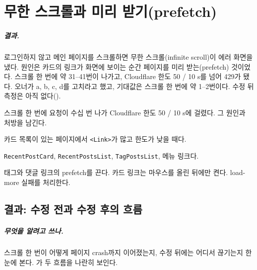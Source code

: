 \chapter{무한 스크롤과 미리 받기(prefetch)}\label{ch:prefetch}

\paragraph{결과.}
로그인하지 않고 메인 페이지를 스크롤하면 무한 스크롤(infinite scroll)이 에러 화면을 냈다.
원인은 카드의 링크가 화면에 보이는 순간 페이지를 미리 받는(prefetch) 것이었다.
스크롤 한 번에 약 31--41번이 나가고, Cloudflare 한도 50 / 10 s를 넘어 429가 됐다.
오너가 a, b, c, d를 고치라고 했고, 기대값은 스크롤 한 번에 약 1--2번이다.
수정 뒤 측정은 아직 없다().

\begin{inbrief}
  \item[Why] 스크롤 한 번에 요청이 수십 번 나가 Cloudflare 한도 50 / 10 s에 걸렸다. 그 원인과 처방을 남긴다.
  \item[When] 카드 목록이 있는 페이지에서 \texttt{<Link>}가 많고 한도가 낮을 때다.
  \item[Where] \texttt{RecentPostCard}, \texttt{RecentPostsList}, \texttt{TagPostsList}, 메뉴 링크다.
  \item[How] 태그와 댓글 링크의 prefetch를 끈다. 카드 링크는 마우스를 올린 뒤에만 켠다. load-more 실패를 처리한다.
\end{inbrief}

\section{결과: 수정 전과 수정 후의 흐름}\label{sec:pf-flow}

\paragraph{무엇을 알려고 쓰나.}
스크롤 한 번이 어떻게 페이지 crash까지 이어졌는지, 수정 뒤에는 어디서 끊기는지 한눈에 본다.
가 두 흐름을 나란히 보인다.


